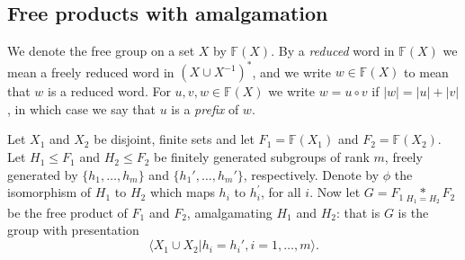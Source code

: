 \documentclass[a4paper,12pt]{article}
\numberwithin{equation}{section}
\numberwithin{figure}{section}
\newcommand{\FF}{\ensuremath{\mathbb{F}}}
\newcommand{\la}{\langle}
\newcommand{\ra}{\rangle}
\begin{document}
\subsection{Free products with amalgamation}\label{sec:intro}

We denote the free group on a set $X$ by $\FF(X)$.
 By a {\em reduced} word in $\FF(X)$  we mean
 a freely reduced word in $(X\cup X^{-1})^\ast$, and we write $w\in \FF(X)$
to mean that $w$ is a reduced word. For $u,v, w\in \FF(X)$ we
write $w=u\circ v$ if $|w|=|u|+|v|$, in which case we say that $u$ is a {\em prefix}
of $w$.

Let $X_1$ and $X_2$ be disjoint,
finite sets and let
$F_1=\FF(X_1)$ and $F_2=\FF(X_2)$.
Let $H_1 \leq F_1$ and  $H_2 \leq F_2$ be finitely generated subgroups of rank $m$,
freely generated by $\{h_1,\ldots, h_m\}$ and  $\{h_1', \ldots, h_m'\}$, respectively.
Denote by $\phi$ the isomorphism of $H_1$ to $H_2$ which maps $h_i$ to  $h_i^\prime$,
for all $i$.
 Now let $G = F_1 \underset{H_1=H_2}{\ast} F_2$ be the free product  of $F_1$ and
$F_2$, amalgamating $H_1$ and $H_2$: that is $G$ is the group
 with
 presentation \[\la X_1\cup X_2 | h_i = h_i', i=1, \ldots ,m\ra.\]
\end{document}
